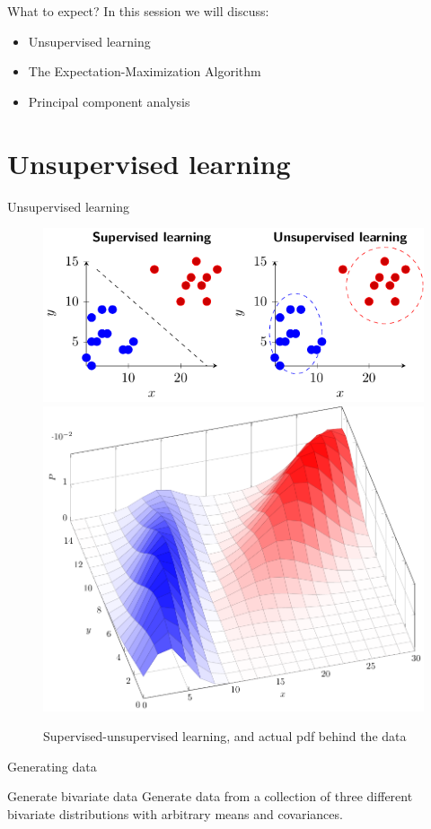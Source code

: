 \documentclass{beamer}
\begin{document}
\begin{frame}{What to expect?}
  In this session we will discuss:
  \begin{itemize}
    \item Unsupervised learning
    \item The Expectation-Maximization Algorithm
    \item Principal component analysis
  \end{itemize}
\end{frame}

\section{Unsupervised learning}

\begin{frame}{Unsupervised learning}
    \begin{figure}
        \includegraphics{supervised_unsupervised}
        \includegraphics[width=0.5\linewidth]{2dbivariate}
        \caption{Supervised-unsupervised learning, and actual pdf behind the data}
        \label{fig:supunsup}
    \end{figure}
\end{frame}

\begin{frame}{Generating data}
    \begin{Exercise}{Generate bivariate data}
        Generate data from a collection of three different bivariate distributions with arbitrary means and covariances.
    \end{Exercise}
\end{frame}
\end{document}
